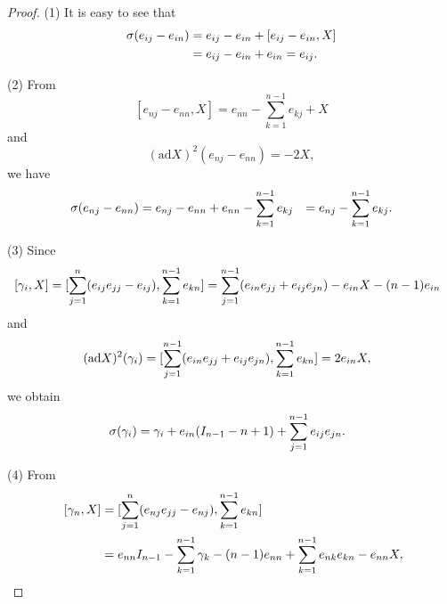 \documentclass[12pt,a4paper]{amsart}
\numberwithin{equation}{section}
\begin{document}
\begin{proof}
(1)
It is easy to see that $$\aligned \sigma(e_{ij}-e_{in})&=e_{ij}-e_{in}+[e_{ij}-e_{in},X]\\
&= e_{ij}-e_{in}+e_{in}=
e_{ij}.
\endaligned $$


(2)  From $$ [e_{nj}-e_{nn}, X]=e_{nn}-\sum_{k=1}^{n-1}e_{kj}+X$$
and  $$  (\mathrm{ad}X)^2(e_{nj}-e_{nn})=-2X, $$
we have
$$\aligned \sigma(e_{nj}-e_{nn})&=e_{nj}-e_{nn}+e_{nn}-\sum_{k=1}^{n-1}e_{kj}
&= e_{nj}-\sum_{k=1}^{n-1}e_{kj}.
\endaligned $$

(3)
Since $$\aligned\  [\gamma_i,X]&=[ \sum_{j=1}^n (e_{ij}e_{jj}-e_{ij}), \sum_{k=1}^{n-1}e_{kn}]
=\sum_{j=1}^{n-1} (e_{in}e_{jj}+e_{ij}e_{jn})
-e_{in}X-(n-1)e_{in}
\endaligned $$
and
$$\aligned\ (\mathrm{ad}X)^2(\gamma_i) & =  [ \sum_{j=1}^{n-1} (e_{in}e_{jj}+e_{ij}e_{jn}), \sum_{k=1}^{n-1}e_{kn}]
=2 e_{in}X,
\endaligned $$
we obtain
$$\aligned\  \sigma( \gamma_i)
&=\gamma_i+e_{in}(I_{n-1}-n+1)
+\sum_{j=1}^{n-1} e_{ij}e_{jn}.
\endaligned $$


(4)
 From $$\aligned\  [\gamma_n, X]&=[ \sum_{j=1}^n (e_{nj}e_{jj}-e_{nj}), \sum_{k=1}^{n-1}e_{kn}]\\
&= e_{nn}I_{n-1}-\sum_{k=1}^{n-1}\gamma_k-(n-1)e_{nn}+ \sum_{k=1}^{n-1} e_{nk}e_{kn}-e_{nn}X,
\endaligned $$


\end{proof}
\end{document}

